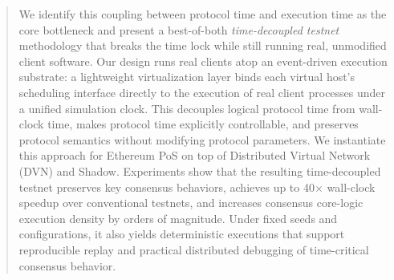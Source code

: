 \begin{abstract}
We identify this coupling between protocol time and execution time as the core bottleneck and present a best-of-both \emph{time-decoupled testnet} methodology that breaks the time lock while still running real, unmodified client software. Our design runs real clients atop an event-driven execution substrate: a lightweight virtualization layer binds each virtual host's scheduling interface directly to the execution of real client processes under a unified simulation clock. This decouples logical protocol time from wall-clock time, makes protocol time explicitly controllable, and preserves protocol semantics without modifying protocol parameters.
We instantiate this approach for Ethereum PoS on top of Distributed Virtual Network (DVN) and Shadow. Experiments show that the resulting time-decoupled testnet preserves key consensus behaviors, achieves up to 40$\times$ wall-clock speedup over conventional testnets, and increases consensus core-logic execution density by orders of magnitude. Under fixed seeds and configurations, it also yields deterministic executions that support reproducible replay and practical distributed debugging of time-critical consensus behavior.
\end{abstract}